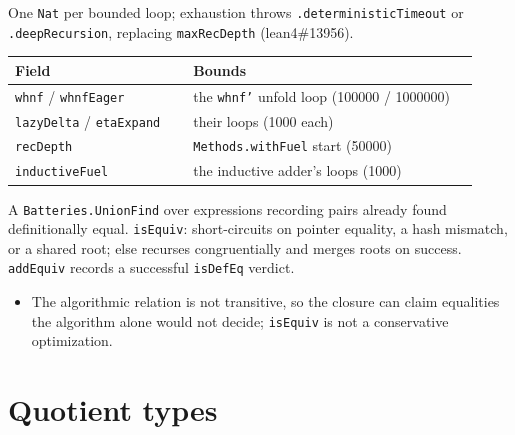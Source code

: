 \begin{definition}
\label{structure:kernel-fuel-config}
\leanok
{} One \texttt{Nat} per bounded loop; exhaustion throws
\texttt{.deterministicTimeout} or \texttt{.deepRecursion}, replacing \texttt{maxRecDepth}
(lean4\#13956).
\par\smallskip\noindent
\begin{tabular}{p{0.35\linewidth}p{0.57\linewidth}}
\toprule
Field & Bounds \\
\midrule
\texttt{whnf} / \texttt{whnfEager} & the \texttt{whnf'} unfold loop (100000 / 1000000) \\
\texttt{lazyDelta} / \texttt{etaExpand} & their loops (1000 each) \\
\texttt{recDepth} & \texttt{Methods.withFuel} start (50000) \\
\texttt{inductiveFuel} & the inductive adder's loops (1000) \\
\bottomrule
\end{tabular}\par\smallskip
\end{definition}

\begin{definition}
\label{def:kernel-equiv-manager}
\leanok
{}
 A \texttt{Batteries.UnionFind} over expressions recording pairs already found
definitionally equal. \texttt{isEquiv}: short-circuits on pointer equality, a hash mismatch, or a
shared root; else recurses congruentially and merges roots on success. \texttt{addEquiv} records a
successful \texttt{isDefEq} verdict.
\begin{itemize}
\item {} The algorithmic relation is not transitive, so the closure can claim
equalities the algorithm alone would not decide; \texttt{isEquiv} is not a conservative
optimization.
\end{itemize}
\end{definition}

\section{Quotient types}

